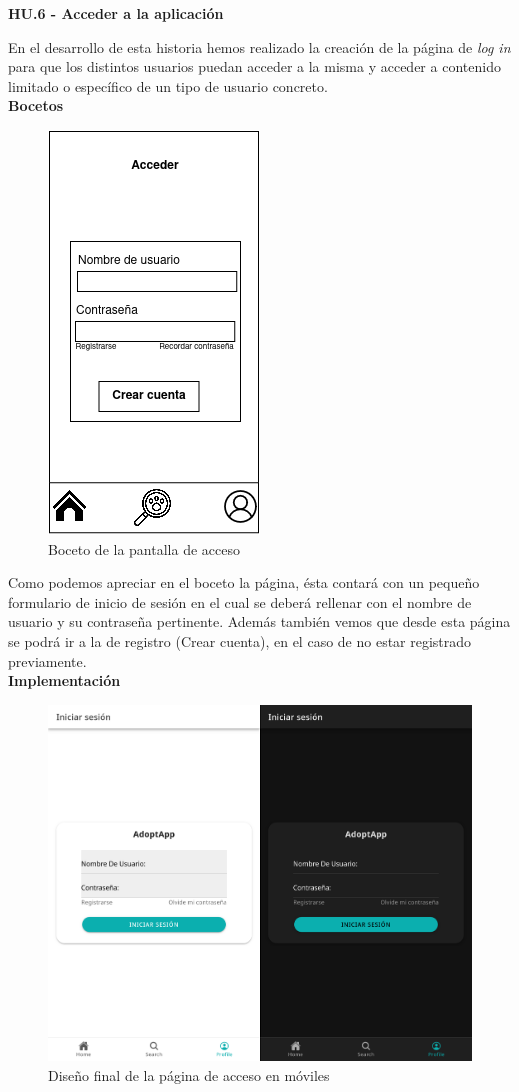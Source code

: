 \Large{\textbf{HU.6 - Acceder a la aplicación}} 

En el desarrollo de esta historia hemos realizado la creación de la página de \textit{log in} para que los distintos usuarios puedan acceder a la misma y acceder a contenido limitado o específico de un tipo de usuario concreto. \\ 

\textbf{Bocetos}


\begin{figure}[H]
	\centering
	\includegraphics[width=0.31\linewidth]{"sprint 2/hu6/login"}
	\caption{Boceto de la pantalla de acceso}
	\label{fig:login}
\end{figure}

Como podemos apreciar en el boceto la página, ésta contará con un pequeño formulario de inicio de sesión en el cual se deberá rellenar con el nombre de usuario y su contraseña pertinente. Además también vemos que desde esta página se podrá ir a la de registro (Crear cuenta), en el caso de no estar registrado previamente. \\

\textbf{Implementación}

\begin{figure}[H]
	\centering
	\includegraphics[width=0.7\linewidth]{"sprint 2/hu6/ImpLoginMovil"}
	\caption{Diseño final de la página de acceso en móviles}
	\label{fig:imploginmovil}
\end{figure}

